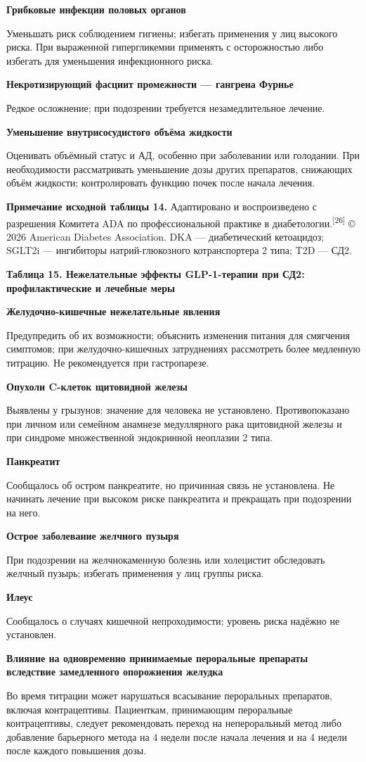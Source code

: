 \documentclass[11pt,a4paper]{article}
\newcommand{\src}[1]{\textsuperscript{[#1]}}
\newcommand{\heading}[1]{\par\medskip\textbf{#1}\par}
\begin{document}
\heading{Грибковые инфекции половых органов}
Уменьшать риск соблюдением гигиены; избегать применения у лиц высокого риска. При выраженной гипергликемии применять с осторожностью либо избегать для уменьшения инфекционного риска.

\heading{Некротизирующий фасциит промежности --- гангрена Фурнье}
Редкое осложнение; при подозрении требуется незамедлительное лечение.

\heading{Уменьшение внутрисосудистого объёма жидкости}
Оценивать объёмный статус и АД, особенно при заболевании или голодании. При необходимости рассматривать уменьшение дозы других препаратов, снижающих объём жидкости; контролировать функцию почек после начала лечения.

\textbf{Примечание исходной таблицы 14.} Адаптировано и воспроизведено с разрешения Комитета ADA по профессиональной практике в диабетологии.\src{26} © 2026 American Diabetes Association. DKA --- диабетический кетоацидоз; SGLT2i --- ингибиторы натрий-глюкозного котранспортера 2 типа; T2D --- СД2.

\heading{Таблица 15. Нежелательные эффекты GLP-1-терапии при СД2: профилактические и лечебные меры}
\heading{Желудочно-кишечные нежелательные явления}
Предупредить об их возможности; объяснить изменения питания для смягчения симптомов; при желудочно-кишечных затруднениях рассмотреть более медленную титрацию. Не рекомендуется при гастропарезе.

\heading{Опухоли C-клеток щитовидной железы}
Выявлены у грызунов; значение для человека не установлено. Противопоказано при личном или семейном анамнезе медуллярного рака щитовидной железы и при синдроме множественной эндокринной неоплазии 2 типа.

\heading{Панкреатит}
Сообщалось об остром панкреатите, но причинная связь не установлена. Не начинать лечение при высоком риске панкреатита и прекращать при подозрении на него.

\heading{Острое заболевание желчного пузыря}
При подозрении на желчнокаменную болезнь или холецистит обследовать желчный пузырь; избегать применения у лиц группы риска.

\heading{Илеус}
Сообщалось о случаях кишечной непроходимости; уровень риска надёжно не установлен.

\heading{Влияние на одновременно принимаемые пероральные препараты вследствие замедленного опорожнения желудка}
Во время титрации может нарушаться всасывание пероральных препаратов, включая контрацептивы. Пациенткам, принимающим пероральные контрацептивы, следует рекомендовать переход на непероральный метод либо добавление барьерного метода на 4 недели после начала лечения и на 4 недели после каждого повышения дозы.
\end{document}
